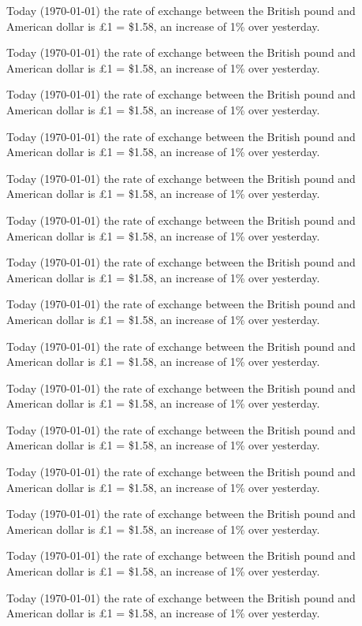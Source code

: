 \documentclass{article}
\begin{document}
Today (\today) the rate of exchange between the British
pound and American dollar is \pounds 1 = \$1.58, an
increase of 1\% over yesterday.

Today (\today) the rate of exchange between the British
pound and American dollar is \pounds 1 = \$1.58, an
increase of 1\% over yesterday.

Today (\today) the rate of exchange between the British
pound and American dollar is \pounds 1 = \$1.58, an
increase of 1\% over yesterday.

Today (\today) the rate of exchange between the British
pound and American dollar is \pounds 1 = \$1.58, an
increase of 1\% over yesterday.

Today (\today) the rate of exchange between the British
pound and American dollar is \pounds 1 = \$1.58, an
increase of 1\% over yesterday.

Today (\today) the rate of exchange between the British
pound and American dollar is \pounds 1 = \$1.58, an
increase of 1\% over yesterday.

Today (\today) the rate of exchange between the British
pound and American dollar is \pounds 1 = \$1.58, an
increase of 1\% over yesterday.

Today (\today) the rate of exchange between the British
pound and American dollar is \pounds 1 = \$1.58, an
increase of 1\% over yesterday.

Today (\today) the rate of exchange between the British
pound and American dollar is \pounds 1 = \$1.58, an
increase of 1\% over yesterday.

Today (\today) the rate of exchange between the British
pound and American dollar is \pounds 1 = \$1.58, an
increase of 1\% over yesterday.

Today (\today) the rate of exchange between the British
pound and American dollar is \pounds 1 = \$1.58, an
increase of 1\% over yesterday.

Today (\today) the rate of exchange between the British
pound and American dollar is \pounds 1 = \$1.58, an
increase of 1\% over yesterday.

Today (\today) the rate of exchange between the British
pound and American dollar is \pounds 1 = \$1.58, an
increase of 1\% over yesterday.

Today (\today) the rate of exchange between the British
pound and American dollar is \pounds 1 = \$1.58, an
increase of 1\% over yesterday.

Today (\today) the rate of exchange between the British
pound and American dollar is \pounds 1 = \$1.58, an
increase of 1\% over yesterday.
\end{document}
